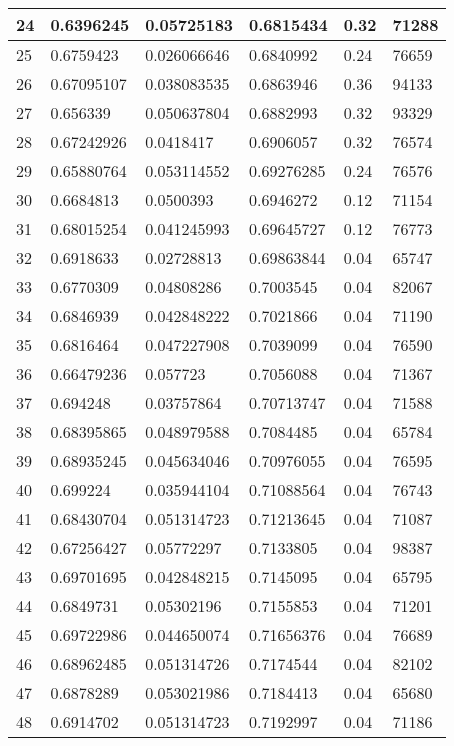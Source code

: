 \begin{longtable}{|l|l|l|l|l|l|}
24 & 0.6396245 & 0.05725183 & 0.6815434 & 0.32 & 71288 \\ \hline 
25 & 0.6759423 & 0.026066646 & 0.6840992 & 0.24 & 76659 \\ \hline 
26 & 0.67095107 & 0.038083535 & 0.6863946 & 0.36 & 94133 \\ \hline 
27 & 0.656339 & 0.050637804 & 0.6882993 & 0.32 & 93329 \\ \hline 
28 & 0.67242926 & 0.0418417 & 0.6906057 & 0.32 & 76574 \\ \hline 
29 & 0.65880764 & 0.053114552 & 0.69276285 & 0.24 & 76576 \\ \hline 
30 & 0.6684813 & 0.0500393 & 0.6946272 & 0.12 & 71154 \\ \hline 
31 & 0.68015254 & 0.041245993 & 0.69645727 & 0.12 & 76773 \\ \hline 
32 & 0.6918633 & 0.02728813 & 0.69863844 & 0.04 & 65747 \\ \hline 
33 & 0.6770309 & 0.04808286 & 0.7003545 & 0.04 & 82067 \\ \hline 
34 & 0.6846939 & 0.042848222 & 0.7021866 & 0.04 & 71190 \\ \hline 
35 & 0.6816464 & 0.047227908 & 0.7039099 & 0.04 & 76590 \\ \hline 
36 & 0.66479236 & 0.057723 & 0.7056088 & 0.04 & 71367 \\ \hline 
37 & 0.694248 & 0.03757864 & 0.70713747 & 0.04 & 71588 \\ \hline 
38 & 0.68395865 & 0.048979588 & 0.7084485 & 0.04 & 65784 \\ \hline 
39 & 0.68935245 & 0.045634046 & 0.70976055 & 0.04 & 76595 \\ \hline 
40 & 0.699224 & 0.035944104 & 0.71088564 & 0.04 & 76743 \\ \hline 
41 & 0.68430704 & 0.051314723 & 0.71213645 & 0.04 & 71087 \\ \hline 
42 & 0.67256427 & 0.05772297 & 0.7133805 & 0.04 & 98387 \\ \hline 
43 & 0.69701695 & 0.042848215 & 0.7145095 & 0.04 & 65795 \\ \hline 
44 & 0.6849731 & 0.05302196 & 0.7155853 & 0.04 & 71201 \\ \hline 
45 & 0.69722986 & 0.044650074 & 0.71656376 & 0.04 & 76689 \\ \hline 
46 & 0.68962485 & 0.051314726 & 0.7174544 & 0.04 & 82102 \\ \hline 
47 & 0.6878289 & 0.053021986 & 0.7184413 & 0.04 & 65680 \\ \hline 
48 & 0.6914702 & 0.051314723 & 0.7192997 & 0.04 & 71186 \\ \hline 

\end{longtable}
